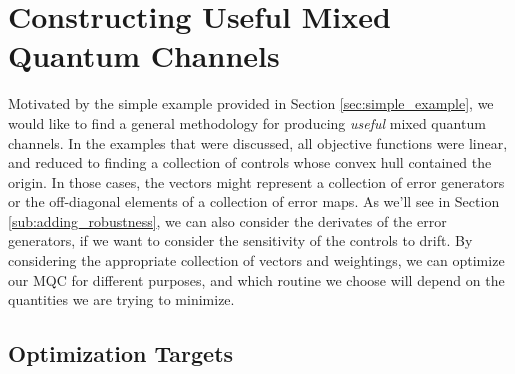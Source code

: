 \documentclass[aps,nofootinbib,pra,notitlepage,twocolumn]{revtex4-1}
\begin{document}
\section{Constructing Useful Mixed Quantum Channels}
\label{sec:mixed_unitary_processes}
Motivated by the simple example provided in Section \ref{sec:simple_example}, we would like to find a general methodology for producing \textit{useful} mixed quantum channels. In the examples that were discussed, all objective functions were linear, and reduced to finding a collection of controls whose convex hull contained the origin. In those cases, the vectors might represent a collection of error generators or the off-diagonal elements of a collection of error maps. As we'll see in Section \ref{sub:adding_robustness}, we can also consider the derivates of the error generators, if we want to consider the sensitivity of the controls to drift. By considering the appropriate collection of vectors and weightings, we can optimize our MQC for different purposes, and which routine we choose will depend on the quantities we are trying to minimize.

\subsection{Optimization Targets}
\end{document}
